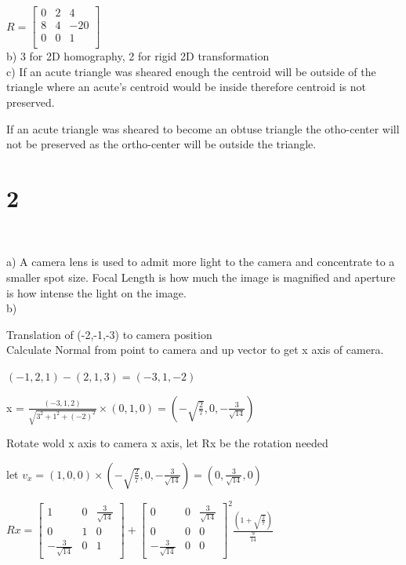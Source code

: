 \documentclass[12pt,a4paper]{article}
\begin{document}
$R = \begin{bmatrix}
0&2&4\\
8&4&-20\\
0&0&1\\
\end{bmatrix}
$
\\

b)
3 for 2D homography, 2 for rigid 2D transformation
\\

c)
If an acute triangle was sheared enough the centroid will be outside of the triangle where an acute's centroid would be inside therefore centroid is not preserved.

If an acute triangle was sheared to become an obtuse triangle the otho-center will not be preserved as the ortho-center will be outside the triangle.

\section*{2}
${}$

a) A camera lens is used to admit more light to the camera and concentrate to a smaller spot size. Focal Length is how much the image is magnified and aperture is how intense the light on the image.
\\

b)

Translation of (-2,-1,-3) to camera position
\\

Calculate Normal from point to camera and up vector to get x axis of camera.

$(-1,2,1) - (2,1,3) = (-3,1,-2)$


x = $\frac{(-3,1,2)}{\sqrt{3^2 + 1^2 + (-2)^2}}\times (0,1,0) = (- \sqrt{\frac{2}{7} }, 0, - \frac{3}{ \sqrt{14} })$

Rotate wold x axis to camera x axis, let Rx be the rotation needed

let $v_x = (1,0,0) \times (- \sqrt{\frac{2}{7} }, 0, - \frac{3}{ \sqrt{14} }) = (0,\frac{3}{\sqrt{14}},0)$

$Rx = \begin{bmatrix}
1&0&\frac{3}{\sqrt{14}}\\
0&1&0\\
-\frac{3}{\sqrt{14}}&0&1
\end{bmatrix} + \begin{bmatrix}
0	&0&\frac{3}{\sqrt{14}}\\
0&0&0\\
-\frac{3}{\sqrt{14}}&0&0
\end{bmatrix}^2 \frac{(1+\sqrt{\frac{2}{7}})}{\frac{9}{14}}$
\end{document}
